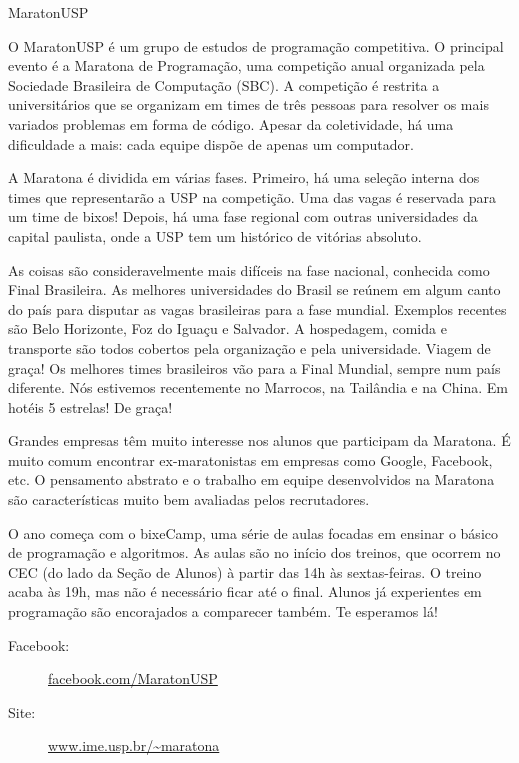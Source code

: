 \begin{subsecao}{MaratonUSP}


O MaratonUSP é um grupo de estudos de programação competitiva. O principal evento é a Maratona de Programação, uma competição anual organizada pela Sociedade Brasileira de Computação (SBC). A competição é restrita a universitários que se organizam em times de três pessoas para resolver os mais variados problemas em forma de código. Apesar da coletividade, há uma dificuldade a mais: cada equipe dispõe de apenas um computador.

A Maratona é dividida em várias fases. Primeiro, há uma seleção interna dos times que representarão a USP na competição. Uma das vagas é reservada para um time de bixos! Depois, há uma fase regional com outras universidades da capital paulista, onde a USP tem um histórico de vitórias absoluto.

As coisas são consideravelmente mais difíceis na fase nacional, conhecida como Final Brasileira. As melhores universidades do Brasil se reúnem em algum canto do país para disputar as vagas brasileiras para a fase mundial. Exemplos recentes são Belo Horizonte, Foz do Iguaçu e Salvador. A hospedagem, comida e transporte são todos cobertos pela organização e pela universidade. Viagem de graça! Os melhores times brasileiros vão para a Final Mundial, sempre num país diferente. Nós estivemos recentemente no Marrocos, na Tailândia e na China. Em hotéis 5 estrelas! De graça!

Grandes empresas têm muito interesse nos alunos que participam da Maratona. É muito comum encontrar ex-maratonistas em empresas como Google, Facebook, etc. O pensamento abstrato e o trabalho em equipe desenvolvidos na Maratona são características muito bem avaliadas pelos recrutadores.

O ano começa com o bixeCamp, uma série de aulas focadas em ensinar o básico de programação e algoritmos. As aulas são no início dos treinos, que ocorrem no CEC (do lado da Seção de Alunos) à partir das 14h às sextas-feiras. O treino acaba às 19h, mas não é necessário ficar até o final. Alunos já experientes em programação são encorajados a comparecer também. Te esperamos lá!

\begin{description}
\item [Facebook:] \url{facebook.com/MaratonUSP}
\item[Site:] \url{www.ime.usp.br/~maratona}
\end{description}

\end{subsecao}
